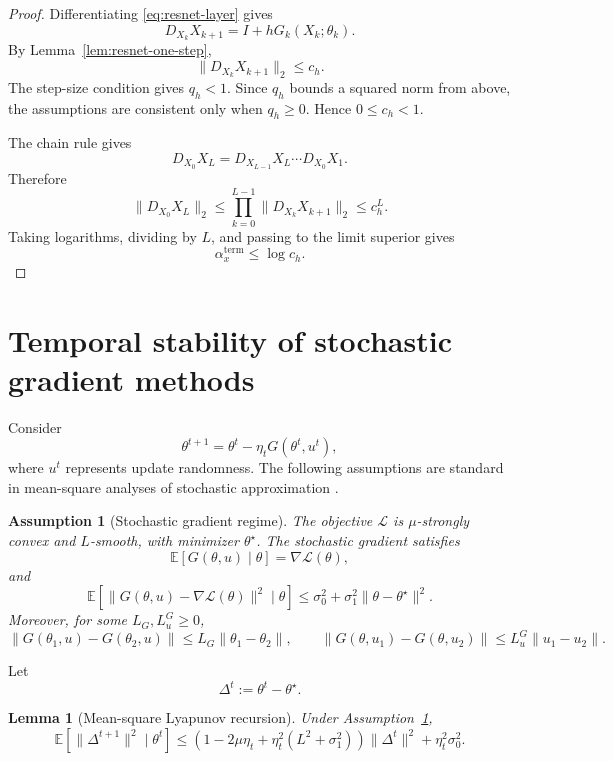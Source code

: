\documentclass{article}
\newtheorem{assumption}{Assumption}
\newtheorem{lemma}[theorem]{Lemma}
\numberwithin{equation}{section}
\begin{document}
\begin{proof}
Differentiating \eqref{eq:resnet-layer} gives
\[
D_{X_k}X_{k+1}=I+hG_k(X_k;\theta_k).
\]
By Lemma~\ref{lem:resnet-one-step},
\[
\|D_{X_k}X_{k+1}\|_2\le c_h .
\]
The step-size condition gives \(q_h<1\). Since \(q_h\) bounds a squared norm from
above, the assumptions are consistent only when \(q_h\ge0\). Hence
\(0\le c_h<1\).

The chain rule gives
\[
D_{X_0}X_L
=
D_{X_{L-1}}X_L\cdots D_{X_0}X_1 .
\]
Therefore
\[
\|D_{X_0}X_L\|_2
\le
\prod_{k=0}^{L-1}\|D_{X_k}X_{k+1}\|_2
\le
c_h^L .
\]
Taking logarithms, dividing by \(L\), and passing to the limit superior gives
\[
\alpha_x^{\mathrm{term}}\le\log c_h .
\]
\end{proof}

\section{Temporal stability of stochastic gradient methods}
\label{sec:sgd-temporal}

Consider
\begin{equation}
\label{eq:sgd-update}
\theta^{t+1}
=
\theta^t-\eta_tG(\theta^t,u^t),
\end{equation}
where \(u^t\) represents update randomness. The following assumptions are
standard in mean-square analyses of stochastic approximation
\cite{KushnerYin2003,Benaim1999,BottouCurtisNocedal2018}.

\begin{assumption}[Stochastic gradient regime]
\label{ass:sgd-regime}
The objective \(\mathcal{L}\) is \(\mu\)-strongly convex and \(L\)-smooth, with
minimizer \(\theta^\star\). The stochastic gradient satisfies
\[
\mathbb{E}[G(\theta,u)\mid\theta]
=
\nabla\mathcal{L}(\theta),
\]
and
\[
\mathbb{E}
\left[
\|G(\theta,u)-\nabla\mathcal{L}(\theta)\|^2
\mid\theta
\right]
\le
\sigma_0^2+\sigma_1^2\|\theta-\theta^\star\|^2 .
\]
Moreover, for some \(L_G,L_u^G\ge0\),
\begin{equation}
\label{eq:sgd-Lpar-Lupd}
\|G(\theta_1,u)-G(\theta_2,u)\|
\le
L_G\|\theta_1-\theta_2\|,
\qquad
\|G(\theta,u_1)-G(\theta,u_2)\|
\le
L_u^G\|u_1-u_2\|.
\end{equation}
\end{assumption}

Let
\[
\Delta^t:=\theta^t-\theta^\star .
\]

\begin{lemma}[Mean-square Lyapunov recursion]
\label{lem:sgd-lyapunov}
Under Assumption~\ref{ass:sgd-regime},
\[
\mathbb{E}
\left[
\|\Delta^{t+1}\|^2
\mid
\theta^t
\right]
\le
\left(1-2\mu\eta_t+\eta_t^2(L^2+\sigma_1^2)\right)\|\Delta^t\|^2
+
\eta_t^2\sigma_0^2 .
\]
\end{lemma}
\end{document}
